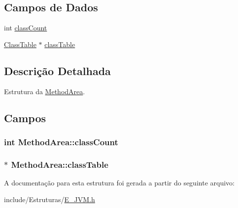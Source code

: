 \subsection*{Campos de Dados}
\begin{DoxyCompactItemize}
\item 
int \hyperlink{struct_method_area_ad6e7303a76ee3e2814565a98f3c4b51e}{class\+Count}
\item 
\hyperlink{struct_class_table}{Class\+Table} $\ast$ \hyperlink{struct_method_area_a094a6be1d96f5aa2f510daa70672b0c6}{class\+Table}
\end{DoxyCompactItemize}


\subsection{Descrição Detalhada}
Estrutura da \hyperlink{struct_method_area}{Method\+Area}. 

\subsection{Campos}
\hypertarget{struct_method_area_ad6e7303a76ee3e2814565a98f3c4b51e}{}
\subsubsection[{class\+Count}]{\setlength{\rightskip}{0pt plus 5cm}int Method\+Area\+::class\+Count}\label{struct_method_area_ad6e7303a76ee3e2814565a98f3c4b51e}
\hypertarget{struct_method_area_a094a6be1d96f5aa2f510daa70672b0c6}{}
\subsubsection[{class\+Table}]{$\ast$ Method\+Area\+::class\+Table}\label{struct_method_area_a094a6be1d96f5aa2f510daa70672b0c6}


A documentação para esta estrutura foi gerada a partir do seguinte arquivo\+:\begin{DoxyCompactItemize}
\item 
include/\+Estruturas/\hyperlink{_e___j_v_m_8h}{E\+\_\+\+J\+V\+M.\+h}\end{DoxyCompactItemize}
